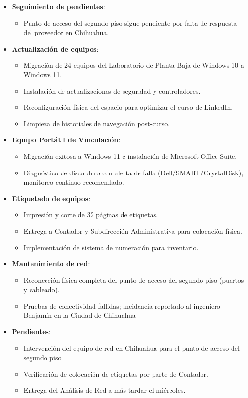 \begin{itemize}
	\item \textbf{Seguimiento de pendientes}:
	\begin{itemize}
		\item Punto de acceso del segundo piso sigue pendiente por falta de respuesta del proveedor en Chihuahua.
	\end{itemize}
	
	\item \textbf{Actualización de equipos}:
	\begin{itemize}
		\item Migración de 24 equipos del Laboratorio de Planta Baja de Windows 10 a Windows 11.
		\item Instalación de actualizaciones de seguridad y controladores.
		\item Reconfiguración física del espacio para optimizar el curso de LinkedIn.
		\item Limpieza de historiales de navegación post-curso.
	\end{itemize}
	
	\item \textbf{Equipo Portátil de Vinculación}:
	\begin{itemize}
		\item Migración exitosa a Windows 11 e instalación de Microsoft Office Suite.
		\item Diagnóstico de disco duro con alerta de falla (Dell/SMART/CrystalDisk), monitoreo continuo recomendado.
	\end{itemize}
	
	\item \textbf{Etiquetado de equipos}:
	\begin{itemize}
		\item Impresión y corte de 32 páginas de etiquetas.
		\item Entrega a Contador y Subdirección Administrativa para colocación física.
		\item Implementación de sistema de numeración para inventario.
	\end{itemize}
	
	\item \textbf{Mantenimiento de red}:
	\begin{itemize}
		\item Reconección física completa del punto de acceso del segundo piso (puertos y cableado).
		\item Pruebas de conectividad fallidas; incidencia reportado al ingeniero Benjamín en la Ciudad de Chihuahua
	\end{itemize}
	
	\item \textbf{Pendientes}:
	\begin{itemize}
		\item Intervención del equipo de red en Chihuahua para el punto de acceso del segundo piso.
		\item Verificación de colocación de etiquetas por parte de Contador.
		\item Entrega del Análisis de Red a más tardar el miércoles.
	\end{itemize}
\end{itemize}

